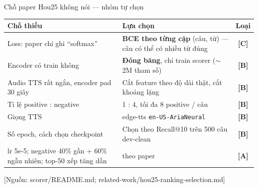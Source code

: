 \documentclass[aspectratio=169,xcolor=table]{beamer}
\newcommand{\hi}[1]{\textcolor{Primary}{\textbf{#1}}}
\newcommand{\src}[1]{{\tiny\color{TextGray}[Nguồn: #1]}}
\begin{document}
\begin{frame}{Chỗ paper Hou25 không nói --- nhóm tự chọn}
\footnotesize\renewcommand{\arraystretch}{1.2}
\begin{tabular}{@{}p{4.6cm}p{6.4cm}c@{}}
\toprule
\textbf{Chỗ thiếu} & \textbf{Lựa chọn} & \textbf{Loại}\\
\midrule
Loss: paper chỉ ghi ``softmax'' & \textbf{BCE theo từng cặp} (câu, từ) --- câu có thể có nhiều từ đúng & \hi{[C]}\\
Encoder có train không & \textbf{Đóng băng}, chỉ train scorer ($\sim$2M tham số) & \hi{[B]}\\
Audio TTS rất ngắn, encoder pad 30 giây & Cắt feature theo độ dài thật, cắt khoảng lặng & \hi{[B]}\\
Tỉ lệ positive : negative & 1 : 4, tối đa 8 positive / câu & \hi{[B]}\\
Giọng TTS & edge-tts \texttt{en-US-AriaNeural} & \hi{[B]}\\
Số epoch, cách chọn checkpoint & Chọn theo Recall@10 trên 500 câu dev-clean & \hi{[B]}\\
\midrule
lr 5e-5; negative 40\% gần + 60\% ngẫu nhiên; top-50 xếp tăng dần & theo paper & \hi{[A]}\\
\bottomrule
\end{tabular}
\vfill
\src{scorer/README.md; related-work/hou25-ranking-selection.md}
\end{frame}

\end{document}
